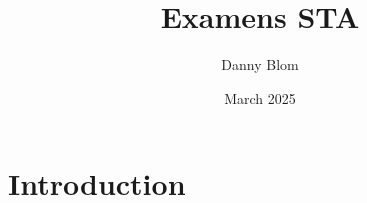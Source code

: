 \documentclass{article}
\title{Examens STA}
\author{Danny Blom}
\date{March 2025}
\begin{document}

\maketitle

\section{Introduction}
\end{document}
